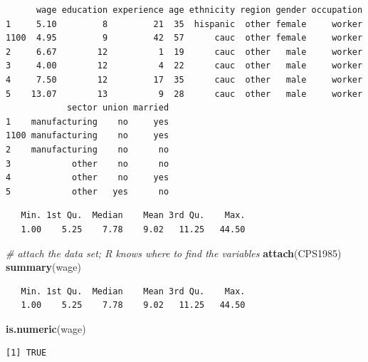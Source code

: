 \documentclass[
]{book}
\newenvironment{Shaded}{\begin{snugshade}}{\end{snugshade}}
\newcommand{\CommentTok}[1]{\textcolor[rgb]{0.56,0.35,0.01}{\textit{#1}}}
\newcommand{\KeywordTok}[1]{\textcolor[rgb]{0.13,0.29,0.53}{\textbf{#1}}}
\newcommand{\NormalTok}[1]{#1}
\newcommand{\OperatorTok}[1]{\textcolor[rgb]{0.81,0.36,0.00}{\textbf{#1}}}
\begin{document}
\begin{verbatim}
      wage education experience age ethnicity region gender occupation
1     5.10         8         21  35  hispanic  other female     worker
1100  4.95         9         42  57      cauc  other female     worker
2     6.67        12          1  19      cauc  other   male     worker
3     4.00        12          4  22      cauc  other   male     worker
4     7.50        12         17  35      cauc  other   male     worker
5    13.07        13          9  28      cauc  other   male     worker
            sector union married
1    manufacturing    no     yes
1100 manufacturing    no     yes
2    manufacturing    no      no
3            other    no      no
4            other    no     yes
5            other   yes      no
\end{verbatim}

\begin{Shaded}
\end{Shaded}

\begin{verbatim}
   Min. 1st Qu.  Median    Mean 3rd Qu.    Max. 
   1.00    5.25    7.78    9.02   11.25   44.50 
\end{verbatim}

\begin{Shaded}
\begin{Highlighting}[]
\CommentTok{# attach the data set; R knows where to find the variables}
\KeywordTok{attach}\NormalTok{(CPS1985)}
\KeywordTok{summary}\NormalTok{(wage)}
\end{Highlighting}
\end{Shaded}

\begin{verbatim}
   Min. 1st Qu.  Median    Mean 3rd Qu.    Max. 
   1.00    5.25    7.78    9.02   11.25   44.50 
\end{verbatim}

\begin{Shaded}
\begin{Highlighting}[]
\KeywordTok{is.numeric}\NormalTok{(wage)}
\end{Highlighting}
\end{Shaded}

\begin{verbatim}
[1] TRUE
\end{verbatim}
\end{document}
